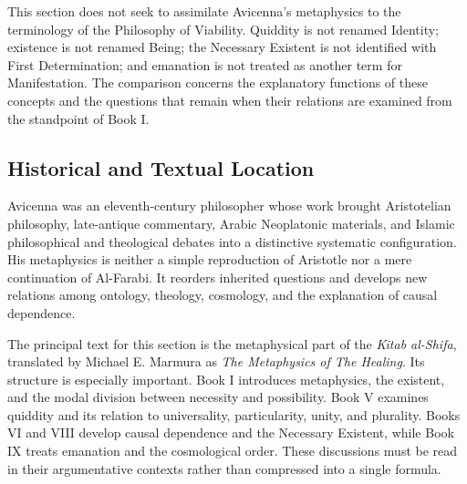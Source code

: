 \label{para:VS.B01.P01.C08.S13.SS01.P005}

This section does not seek to assimilate Avicenna's
metaphysics to the terminology of the Philosophy
of Viability. Quiddity is not renamed Identity;
existence is not renamed Being; the Necessary
Existent is not identified with First Determination;
and emanation is not treated as another term for
Manifestation. The comparison concerns the
explanatory functions of these concepts and the
questions that remain when their relations are
examined from the standpoint of Book I.



\subsection{Historical and Textual Location}
\label{subsec:ch08-avicenna-historical}

\label{para:VS.B01.P01.C08.S13.SS02.P001}

Avicenna was an eleventh-century philosopher whose
work brought Aristotelian philosophy, late-antique
commentary, Arabic Neoplatonic materials, and
Islamic philosophical and theological debates
into a distinctive systematic configuration.
His metaphysics is neither a simple reproduction
of Aristotle nor a mere continuation of Al-Farabi.
It reorders inherited questions and develops
new relations among ontology, theology, cosmology,
and the explanation of causal dependence.

\label{para:VS.B01.P01.C08.S13.SS02.P002}

The principal text for this section is the
metaphysical part of the \textit{Kitab al-Shifa},
translated by Michael E. Marmura as
\textit{The Metaphysics of The Healing}. Its
structure is especially important. Book I
introduces metaphysics, the existent, and
the modal division between necessity and
possibility. Book V examines quiddity and
its relation to universality, particularity,
unity, and plurality. Books VI and VIII
develop causal dependence and the Necessary
Existent, while Book IX treats emanation
and the cosmological order. These discussions
must be read in their argumentative contexts
rather than compressed into a single formula.
\citep[Ilahiyyat, Books I, V, VI, VIII--IX]{AvicennaMetaphysics}

